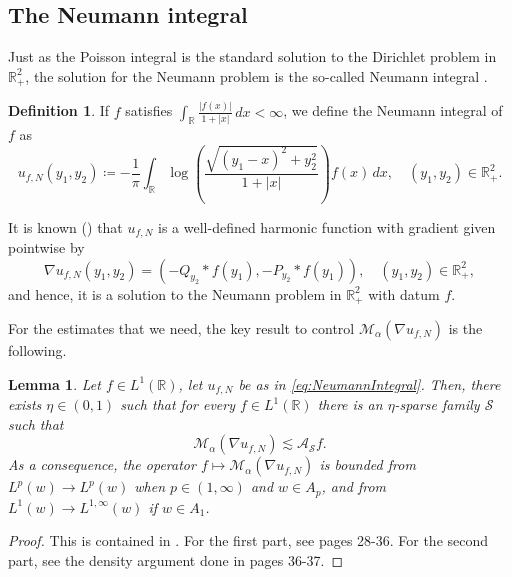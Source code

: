 \documentclass[12pt]{amsart}
\newcommand{\R}{\mathbb{R}}
\theoremstyle{plain}
\newtheorem{lemma}[theorem]{Lemma}
\theoremstyle{definition}
\newtheorem{definition}[theorem]{Definition}
\numberwithin{equation}{section}
\begin{document}
\subsection{The Neumann integral}

Just as the Poisson integral is the standard solution to the Dirichlet problem in $\R_{+}^{2}$, the solution for the Neumann problem is the so-called Neumann integral \cite{ArmitageHalfSpace}.

\begin{definition}\label{def:neumannIntegral}
    If $f$ satisfies $\int_{\R}\frac{|f(x)|}{1+|x|}\, dx<\infty$, we define the Neumann integral of $f$ as
    \begin{equation}\label{eq:NeumannIntegral}
    u_{f,N}\left(y_1, y_2\right)
    \coloneqq 
    -\frac{1}{\pi} \int_{\mathbb{R}} \log \left(\frac{\sqrt{(y_1-x)^2+y_2^2}}{1+|x|}\right) f(x) \, dx, \quad (y_1, y_2) \in \R_{+}^2. 
    \end{equation}
    \end{definition}
    It is known  (\cite{CNO}) that $u_{f,N}$ is a well-defined harmonic function with gradient given pointwise by
    \begin{equation}\label{eq:gradientNeumannIntegral}
    \nabla u_{f,N}(y_1,y_2)
    =
    (-Q_{y_2}\ast f(y_1),-P_{y_2}\ast f(y_1)),
    \quad (y_1,y_2)\in \R_{+}^{2},    
    \end{equation}
    and hence, it is a solution to the Neumann problem in $\R_{+}^{2}$ with datum $f$.
    
For the estimates that we need, the key result to control $\mathcal{M}_{\alpha}(\nabla u_{f,N})$ is the following.

\begin{lemma}\label{thm:sparseDominationNonTangential}
    Let $f \in L^1(\mathbb{R})$, let $u_{f,N}$ be as in \eqref{eq:NeumannIntegral}. Then, there exists $\eta\in (0,1)$ such that for every $f\in L^1(\R)$ there is an $\eta$-sparse family $\mathcal{S}$ such that 
    \[
    \mathcal{M}_{\alpha}(\nabla u_{f,N})\lesssim 
    \mathcal{A}_{\mathcal{S}}f.
    \]
    As a consequence, the operator $f\mapsto \mathcal{M}_{\alpha}(\nabla u_{f,N})$ is bounded from $L^{p}(w)\to L^{p}(w)$ when $p\in (1,\infty)$ and $w\in A_p$, and from $L^1(w)\to L^{1,\infty}(w)$ if $w\in A_1$.
\end{lemma}


\begin{proof}
    This is contained in \cite{CNO}. For the first part, see pages 28-36. For the second part, see the density argument done in pages 36-37.
\end{proof}
\end{document}
